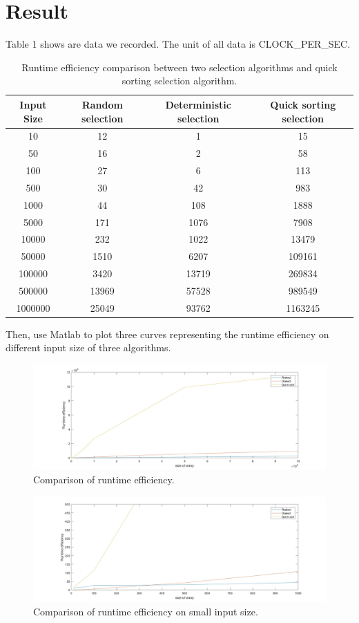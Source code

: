 \documentclass{article}
\begin{document}
\section{Result}
Table 1 shows are data we recorded. The unit of all data is CLOCK\_PER\_SEC.\\
\begin{table}[!hbp]
\centering
\begin{tabular}{|c||c|c|c|}
\hline
Input Size & Random selection & Deterministic selection & Quick sorting selection\\
\hline
10 & 12 & 1 & 15 \\
50 & 16 & 2 & 58 \\
100 & 27 & 6 & 113\\
500 & 30 & 42 & 983\\
1000 & 44 & 108 & 1888\\
5000 & 171 & 1076 & 7908\\
10000 & 232 & 1022 & 13479\\
50000 & 1510 & 6207 & 109161\\
100000 & 3420 & 13719 & 269834\\
500000 & 13969 & 57528 & 989549\\
1000000 & 25049 & 93762 & 1163245\\
\hline
\end{tabular}
\caption{Runtime efficiency comparison between two selection algorithms and quick sorting selection algorithm.}
\end{table}
Then, use Matlab to plot three curves representing the runtime efficiency on different input size of three algorithms. \\
\begin{figure}[H]
\centering
\includegraphics[width=\textwidth]{1.jpg}
\caption{Comparison of runtime efficiency.}
\end{figure}
\begin{figure}[H]
\centering
\includegraphics[width=\textwidth]{2.jpg}
\caption{Comparison of runtime efficiency on small input size.}
\end{figure}
\end{document}

